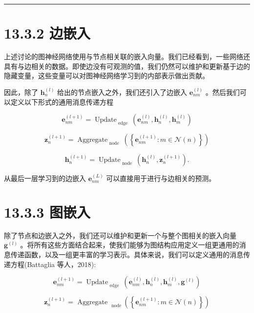 \documentclass[10pt]{report}
\newcommand{\HRule}{\begin{center}\rule{0.9\linewidth}{0.2mm}\end{center}}
\begin{document}
\HRule

\section*{13.3.2 边嵌入}

上述讨论的图神经网络使用与节点相关联的嵌入向量。我们已经看到，一些网络还具有与边相关的数据。即使边没有可观测的值，我们仍然可以维护和更新基于边的隐藏变量，这些变量可以对图神经网络学习到的内部表示做出贡献。

因此，除了 \({\mathbf{h}}_{n}^{\left( l\right) }\) 给出的节点嵌入之外，我们还引入了边嵌入 \({\mathbf{e}}_{nm}^{\left( l\right) }\) 。然后我们可以定义以下形式的通用消息传递方程

\[
{\mathbf{e}}_{nm}^{\left( l + 1\right) } = {\operatorname{Update}}_{\text{ edge }}\left( {{\mathbf{e}}_{nm}^{\left( l\right) },{\mathbf{h}}_{n}^{\left( l\right) },{\mathbf{h}}_{m}^{\left( l\right) }}\right)  \tag{13.29}
\]

\[
{\mathbf{z}}_{n}^{\left( l + 1\right) } = {\operatorname{Aggregate}}_{\text{ node }}\left( \left\{  {{\mathbf{e}}_{nm}^{\left( l + 1\right) } : m \in  \mathcal{N}\left( n\right) }\right\}  \right)  \tag{13.30}
\]

\[
{\mathbf{h}}_{n}^{\left( l + 1\right) } = {\operatorname{Update}}_{\text{ node }}\left( {{\mathbf{h}}_{n}^{\left( l\right) },{\mathbf{z}}_{n}^{\left( l + 1\right) }}\right) . \tag{13.31}
\]

从最后一层学习到的边嵌入 \({\mathbf{e}}_{nm}^{\left( L\right) }\) 可以直接用于进行与边相关的预测。

\section*{13.3.3 图嵌入}

除了节点和边嵌入之外，我们还可以维护和更新一个与整个图相关的嵌入向量 \({\mathbf{g}}^{\left( l\right) }\) 。将所有这些方面结合起来，使我们能够为图结构应用定义一组更通用的消息传递函数，以及一组更丰富的学习表示。具体来说，我们可以定义通用的消息传递方程(Battaglia 等人，2018):

\[
{\mathbf{e}}_{nm}^{\left( l + 1\right) } = {\operatorname{Update}}_{\text{ edge }}\left( {{\mathbf{e}}_{nm}^{\left( l\right) },{\mathbf{h}}_{n}^{\left( l\right) },{\mathbf{h}}_{m}^{\left( l\right) },{\mathbf{g}}^{\left( l\right) }}\right)  \tag{13.32}
\]

\[
{\mathbf{z}}_{n}^{\left( l + 1\right) } = {\text{ Aggregate }}_{\text{ node }}\left( \left\{  {{\mathbf{e}}_{nm}^{\left( l + 1\right) } : m \in  \mathcal{N}\left( n\right) }\right\}  \right)  \tag{13.33}
\]
\end{document}
